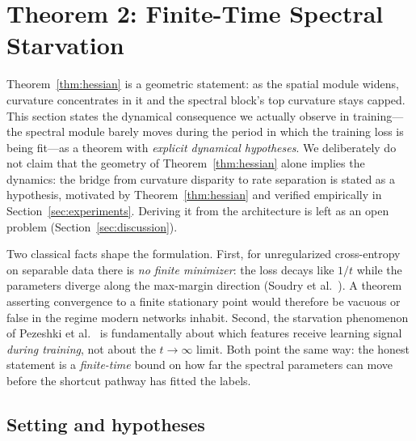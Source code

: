 \section{Theorem 2: Finite-Time Spectral Starvation}
\label{sec:thm2}

Theorem~\ref{thm:hessian} is a geometric statement: as the spatial
module widens, curvature concentrates in it and the spectral block's
top curvature stays capped. This section states the dynamical
consequence we actually observe in training---the spectral module
barely moves during the period in which the training loss is being
fit---as a theorem with \emph{explicit dynamical hypotheses}. We
deliberately do not claim that the geometry of
Theorem~\ref{thm:hessian} alone implies the dynamics: the bridge from
curvature disparity to rate separation is stated as a hypothesis,
motivated by Theorem~\ref{thm:hessian} and verified empirically in
Section~\ref{sec:experiments}. Deriving it from the architecture is
left as an open problem (Section~\ref{sec:discussion}).

Two classical facts shape the formulation. First, for unregularized
cross-entropy on separable data there is \emph{no finite minimizer}:
the loss decays like $1/t$ while the parameters diverge along the
max-margin direction (Soudry et al.~\cite{soudry2018implicit}).
A theorem asserting convergence to a finite stationary point would
therefore be vacuous or false in the regime modern networks inhabit.
Second, the starvation phenomenon of Pezeshki et
al.~\cite{pezeshki2021gradient} is fundamentally about which features
receive learning signal \emph{during training}, not about the
$t \to \infty$ limit. Both point the same way: the honest statement is
a \emph{finite-time} bound on how far the spectral parameters can move
before the shortcut pathway has fitted the labels.

\subsection{Setting and hypotheses}

